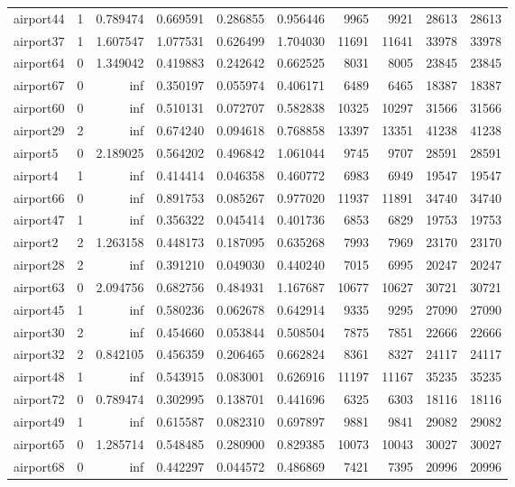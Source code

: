 \begin{longtable}{|l|r|r|r|r|r|r|r|r|r|}
airport44 & 1 & 0.789474 & 0.669591 & 0.286855 & 0.956446 & 9965 & 9921 & 28613 & 28613 \\
airport37 & 1 & 1.607547 & 1.077531 & 0.626499 & 1.704030 & 11691 & 11641 & 33978 & 33978 \\
airport64 & 0 & 1.349042 & 0.419883 & 0.242642 & 0.662525 & 8031 & 8005 & 23845 & 23845 \\
airport67 & 0 & inf & 0.350197 & 0.055974 & 0.406171 & 6489 & 6465 & 18387 & 18387 \\
airport60 & 0 & inf & 0.510131 & 0.072707 & 0.582838 & 10325 & 10297 & 31566 & 31566 \\
airport29 & 2 & inf & 0.674240 & 0.094618 & 0.768858 & 13397 & 13351 & 41238 & 41238 \\
airport5 & 0 & 2.189025 & 0.564202 & 0.496842 & 1.061044 & 9745 & 9707 & 28591 & 28591 \\
airport4 & 1 & inf & 0.414414 & 0.046358 & 0.460772 & 6983 & 6949 & 19547 & 19547 \\
airport66 & 0 & inf & 0.891753 & 0.085267 & 0.977020 & 11937 & 11891 & 34740 & 34740 \\
airport47 & 1 & inf & 0.356322 & 0.045414 & 0.401736 & 6853 & 6829 & 19753 & 19753 \\
airport2 & 2 & 1.263158 & 0.448173 & 0.187095 & 0.635268 & 7993 & 7969 & 23170 & 23170 \\
airport28 & 2 & inf & 0.391210 & 0.049030 & 0.440240 & 7015 & 6995 & 20247 & 20247 \\
airport63 & 0 & 2.094756 & 0.682756 & 0.484931 & 1.167687 & 10677 & 10627 & 30721 & 30721 \\
airport45 & 1 & inf & 0.580236 & 0.062678 & 0.642914 & 9335 & 9295 & 27090 & 27090 \\
airport30 & 2 & inf & 0.454660 & 0.053844 & 0.508504 & 7875 & 7851 & 22666 & 22666 \\
airport32 & 2 & 0.842105 & 0.456359 & 0.206465 & 0.662824 & 8361 & 8327 & 24117 & 24117 \\
airport48 & 1 & inf & 0.543915 & 0.083001 & 0.626916 & 11197 & 11167 & 35235 & 35235 \\
airport72 & 0 & 0.789474 & 0.302995 & 0.138701 & 0.441696 & 6325 & 6303 & 18116 & 18116 \\
airport49 & 1 & inf & 0.615587 & 0.082310 & 0.697897 & 9881 & 9841 & 29082 & 29082 \\
airport65 & 0 & 1.285714 & 0.548485 & 0.280900 & 0.829385 & 10073 & 10043 & 30027 & 30027 \\
airport68 & 0 & inf & 0.442297 & 0.044572 & 0.486869 & 7421 & 7395 & 20996 & 20996 \\

\end{longtable}
